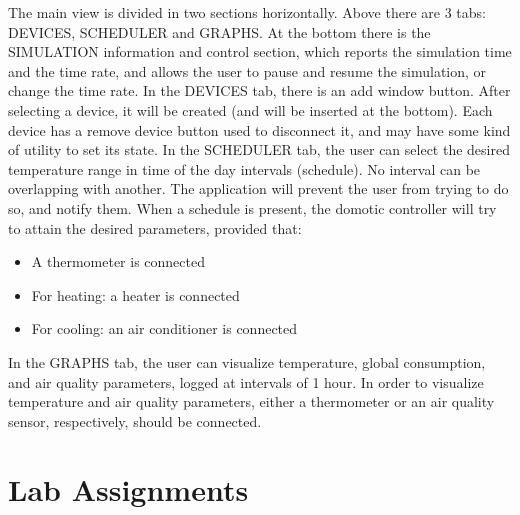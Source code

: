 \documentclass[a4paper,12pt]{report}
\begin{document}
The main view is divided in two sections horizontally. \newline
Above there are 3 tabs: DEVICES, SCHEDULER and GRAPHS. \newline
At the bottom there is the SIMULATION information and control section, which reports the simulation time and the time rate, and allows the user to pause and resume the simulation, or change the time rate. \newline
In the DEVICES tab, there is an add window button. After selecting a device,
it will be created (and will be inserted at the bottom). Each device has a remove device button
used to disconnect it, and may have some kind of utility to set its state. \newline
In the SCHEDULER tab, the user can select the desired temperature range in time of the day intervals (schedule). \newline
No interval can be overlapping with another. The application will prevent the user from trying to do so, and notify them. \newline
When a schedule is present, the domotic controller will try to attain the desired parameters, provided that:
\begin{itemize}
	\item A thermometer is connected
	\item For heating: a heater is connected
	\item For cooling: an air conditioner is connected
\end{itemize}
In the GRAPHS tab, the user can visualize temperature, global consumption, and air quality parameters, logged at intervals of 1 hour. \newline
In order to visualize temperature and air quality parameters, either a thermometer or an air quality sensor, respectively, should be connected.


\chapter{Lab Assignments}





\end{document}
